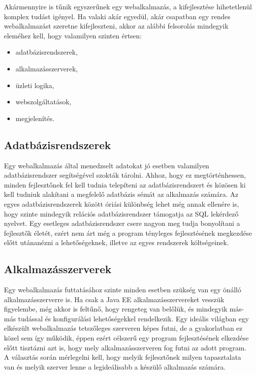 \documentclass[hidelinks, 12pt, a4paper]{report}
\begin{document}
Akármennyire is tűnik egyszerűnek egy webalkalmazás, a kifejlesztése hihetetlenül komplex tudást igényel. Ha valaki akár egyedül, akár csapatban egy rendes webalkalmazást szeretne kifejleszteni, akkor az alábbi felsorolás mindegyik eleméhez kell, hogy valamilyen szinten értsen:
\begin{itemize}
\item adatbázisrendszerek,
\item alkalmazásszerverek,
\item üzleti logika,
\item webszolgáltatások,
\item megjelenítés.
\end{itemize}

\subsection{Adatbázisrendszerek}

Egy webalkalmazás által menedzselt adatokat jó esetben valamilyen adatbázisrendszer segítségével szokták tárolni. Ahhoz, hogy ez megtörténhessen, minden fejlesztőnek fel kell tudnia telepíteni az adatbázisrendszert és közösen ki kell tudniuk alakítani a megfelelő adatbázis sémát az alkalmazás számára. Az egyes adatbázisrendszerek között óriási különbség lehet még annak ellenére is, hogy szinte mindegyik relációs adatbázisrendszer támogatja az SQL lekérdező nyelvet. Egy esetleges adatbázisrendszer csere nagyon meg tudja bonyolítani a fejlesztők életét, ezért nem árt még a program tényleges fejlesztésének megkezdése előtt utánanézni a lehetőségeknek, illetve az egyes rendszerek költségeinek.


\subsection{Alkalmazásszerverek}

Egy webalkalmazás futtatásához szinte minden esetben szükség van egy önálló alkalmazásszerverre is. Ha csak a Java EE alkalmazásszervereket vesszük figyelembe, még akkor is feltűnő, hogy rengeteg van belőlük, és mindegyik más-más tudással és konfigurálási lehetőségekkel rendelkezik. Egy ideális világban egy elkészült webalkalmazás tetszőleges szerveren képes futni, de a gyakorlatban ez közel sem így működik, éppen ezért célszerű egy program fejlesztésének elkezdése előtt tisztázni azt is, hogy mely alkalmazásszerveren fog futni az adott program. A választás során mérlegelni kell, hogy melyik fejlesztőnek milyen tapasztalata van és melyik szerver lenne a legideálisabb a készülő alkalmazás számára.
\end{document}
